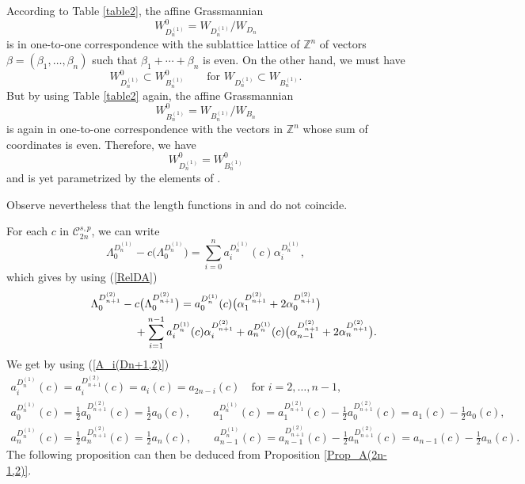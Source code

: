 \documentclass[10pt,a4paper]{amsart}
\numberwithin{equation}{section}
\begin{document}
According to Table \ref{table2}, the affine Grassmannian
\[
W_{D_{n}^{(1)}}^{0}=W_{D_{n}^{(1)}}/W_{D_{n}}
\]
 is in one-to-one
correspondence with the sublattice lattice of $\mathbb{Z}^{n}$ of vectors $%
\beta =(\beta _{1},\dots ,\beta _{n})$ such that $\beta _{1}+\cdots +\beta
_{n}$ is even. On the other hand, we must have
\[
W_{D_{n}^{(1)}}^{0}\subset
W_{B_{n}^{(1)}}^{0}\qquad \text{for $W_{D_{n}^{(1)}}\subset W_{B_{n}^{(1)}}$}.
\]
 But by
using Table \ref{table2} again, the affine Grassmannian
\[
W_{B_{n}^{(1)}}^{0}=W_{B_{n}^{(1)}}/W_{B_{n}}
\]
 is again in one-to-one
correspondence with the vectors in $\mathbb{Z}^{n}$ whose sum of coordinates
is even. Therefore, we have
\[
W_{D_{n}^{(1)}}^{0}=W_{B_{n}^{(1)}}^{0}
\]
 and 
 is yet parametrized by the elements of .

 Observe nevertheless that the length functions in  and  do not coincide.



For each $c$ in $\mathcal{C}_{2n}^{s,p}$, we can write%
\begin{equation*}
\Lambda _{0}^{D_{n}^{(1)}}-c\bigl(\Lambda
_{0}^{D_{n}^{(1)}}\bigr)=\sum_{i=0}^{n}a_{i}^{D_{n}^{(1)}}(c)\alpha
_{i}^{D_{n}^{(1)}},
\end{equation*}%
which gives by using (\ref{RelDA})%
\begin{gather*}
\Lambda _{0}^{D_{n+1}^{(2)}}-c\bigl(\Lambda_{0}^{D_{n+1}^{(2)}}\bigr)= a_{0}^{D_{n}^{(1)}}(c)\bigl(\alpha_{1}^{D_{n+1}^{(2)}}+2\alpha_{0}^{D_{n+1}^{(2)}}\bigr) \\
\hphantom{\Lambda _{0}^{D_{n+1}^{(2)}}-c(\Lambda_{0}^{D_{n+1}^{(2)}})=}{}
+\sum_{i=1}^{n-1}a_{i}^{D_{n}^{(1)}}(c)\alpha_{i}^{D_{n+1}^{(2)}}+a_{n}^{D_{n}^{(1)}}(c)\bigl(\alpha_{n-1}^{D_{n+1}^{(2)}}+2\alpha _{n}^{D_{n+1}^{(2)}}\bigr) .
\end{gather*}
We get by using (\ref{A_i(Dn+1,2)})
\begin{gather*}
a_{i}^{D_{n}^{(1)}}(c)=a_{i}^{D_{n+1}^{(2)}}(c)=a_{i}(c)=a_{2n-i}(c)\quad \text{for }i=2,\dots ,n-1 ,\\
a_{0}^{D_{n}^{(1)}}(c)=\frac{1}{2}a_{0}^{D_{n+1}^{(2)}}(c)=\frac{1}{2}
a_{0}(c), \qquad a_{1}^{D_{n}^{(1)}}(c)=a_{1}^{D_{n+1}^{(2)}}(c)-\frac{1}{
	2}a_{0}^{D_{n+1}^{(2)}}(c)=a_{1}(c)-\frac{1}{2}a_{0}(c) ,\\
a_{n}^{D_{n}^{(1)}}(c)=\frac{1}{2}a_{n}^{D_{n+1}^{(2)}}(c)=\frac{1}{2}
a_{n}(c),\qquad  a_{n-1}^{D_{n}^{(1)}}(c)=a_{n-1}^{D_{n+1}^{(2)}}(c)-
\frac{1}{2}a_{n}^{D_{n+1}^{(2)}}(c)=a_{n-1}(c)-\frac{1}{2}a_{n}(c).	
\end{gather*}
The following proposition can then be deduced from Proposition \ref{Prop_A(2n-1,2)}.
\end{document}
